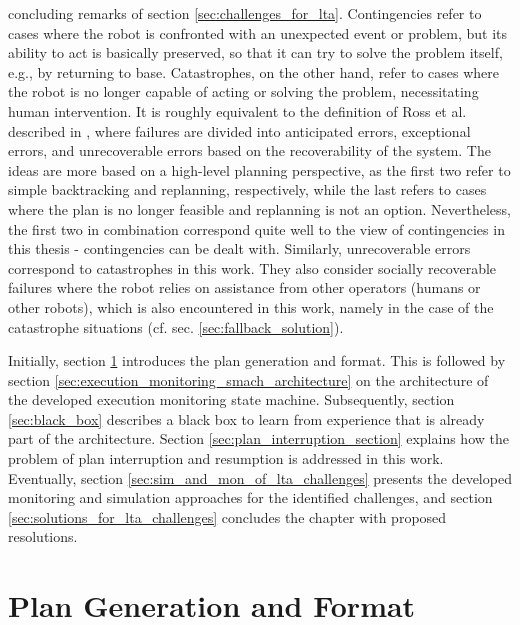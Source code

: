 \documentclass[english, master, utf8]{base/thesis_KBS}
\begin{document}
concluding remarks of section \ref{sec:challenges_for_lta}. Contingencies refer to cases where the robot is confronted with an unexpected event or problem, but its ability to act is
basically preserved, so that it can try to solve the problem itself, e.g., by returning to base. Catastrophes, on the other hand, refer to cases where the robot is no longer capable of
acting or solving the problem, necessitating human intervention. It is roughly equivalent to the definition of Ross et al. described in \cite{Honig:2018}, where
failures are divided into anticipated errors, exceptional errors, and unrecoverable errors based on the recoverability of the system. The ideas are more based on a high-level planning
perspective, as the first two refer to simple backtracking and replanning, respectively, while the last refers to cases where the plan is no longer feasible and replanning is not an
option. Nevertheless, the first two in combination correspond quite well to the view of contingencies in this thesis - contingencies can be dealt with. Similarly, unrecoverable errors
correspond to catastrophes in this work. They also consider socially recoverable failures where the robot relies on assistance from other operators (humans or other robots), which
is also encountered in this work, namely in the case of the catastrophe situations (cf. sec. \ref{sec:fallback_solution}).\newline

\noindent
Initially, section \ref{sec:plan_generation} introduces the plan generation and format. This is followed by section \ref{sec:execution_monitoring_smach_architecture} on the
architecture of the developed execution monitoring state machine. Subsequently, section \ref{sec:black_box} describes a black box to learn from experience that is already part of
the architecture. Section \ref{sec:plan_interruption_section} explains how the problem of plan interruption and resumption is addressed in this work. Eventually, section
\ref{sec:sim_and_mon_of_lta_challenges} presents the developed monitoring and simulation approaches for the identified challenges, and section \ref{sec:solutions_for_lta_challenges}
concludes the chapter with proposed resolutions.

\section{Plan Generation and Format}
\label{sec:plan_generation}
\end{document}
